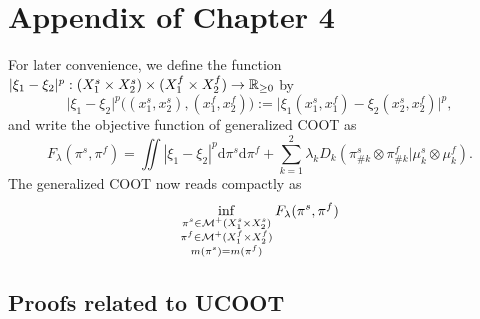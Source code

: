 \section{Appendix of Chapter 4}

For later convenience, we define the function
$\vert \xi_1 - \xi_2 \vert^p: (X_1^s \times X_2^s) \times (X_1^f \times X_2^f) \to \mathbb R_{\geq 0}$ by
\begin{equation}
    \vert \xi_1 - \xi_2 \vert^p \big((x_1^s, x_2^s), (x_1^f, x_2^f)\big) :=
    \vert \xi_1(x_1^s, x_1^f) - \xi_2(x_2^s, x_2^f) \vert^p,
\end{equation}
and write the objective function of generalized COOT as
\begin{equation}
    F_{\lambda}(\pi^s, \pi^f) = \iint |\xi_1 - \xi_2|^p \mathrm d\pi^s \mathrm d \pi^f
    + \sum_{k=1}^2\lambda_k D_k(\pi^s_{\#k} \otimes \pi^f_{\#k} \vert \mu^s_k \otimes \mu^f_k).
\end{equation}
The generalized COOT now reads compactly as
\begin{equation} \label{eq:ucoot_copy}
  \inf_{\substack{\pi^s \in \mathcal M^+(X_1^s \times X_2^s) \\
  \pi^f \in \mathcal M^+(X_1^f \times X_2^f) \\ m(\pi^s) = m(\pi^f)}} F_{\lambda}(\pi^s, \pi^f)
\end{equation}

\subsection{Proofs related to UCOOT}

